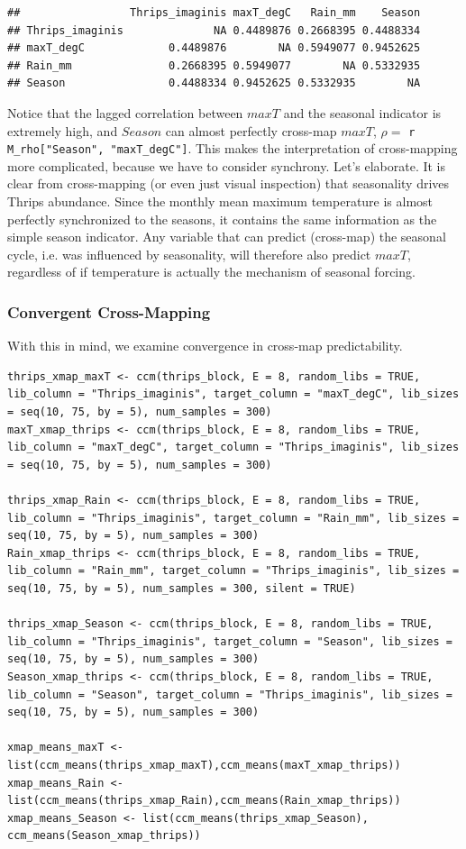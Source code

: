 \begin{lstlisting}[backgroundcolor = \color{white}, commentstyle = \ttfamily]
##                 Thrips_imaginis maxT_degC   Rain_mm    Season
## Thrips_imaginis              NA 0.4489876 0.2668395 0.4488334
## maxT_degC             0.4489876        NA 0.5949077 0.9452625
## Rain_mm               0.2668395 0.5949077        NA 0.5332935
## Season                0.4488334 0.9452625 0.5332935        NA
\end{lstlisting}

Notice that the lagged correlation between $maxT$ and the seasonal indicator is extremely high, and $Season$ can almost perfectly cross-map $maxT$, $\rho =$ \lstinline{r M_rho["Season", "maxT_degC"]}. This makes the interpretation of cross-mapping more complicated, because we have to consider synchrony. Let's elaborate. It is clear from cross-mapping (or even just visual inspection) that seasonality drives Thrips abundance. Since the monthly mean maximum temperature is almost perfectly synchronized to the seasons, it contains the same information as the simple season indicator. Any variable that can predict (cross-map) the seasonal cycle, i.e. was influenced by seasonality, will therefore also predict $maxT$, regardless of if temperature is actually the mechanism of seasonal forcing.

\subsubsection{Convergent Cross-Mapping}

With this in mind, we examine convergence in cross-map predictability.

\begin{lstlisting}
thrips_xmap_maxT <- ccm(thrips_block, E = 8, random_libs = TRUE, lib_column = "Thrips_imaginis", target_column = "maxT_degC", lib_sizes = seq(10, 75, by = 5), num_samples = 300)
maxT_xmap_thrips <- ccm(thrips_block, E = 8, random_libs = TRUE, lib_column = "maxT_degC", target_column = "Thrips_imaginis", lib_sizes = seq(10, 75, by = 5), num_samples = 300)

thrips_xmap_Rain <- ccm(thrips_block, E = 8, random_libs = TRUE, lib_column = "Thrips_imaginis", target_column = "Rain_mm", lib_sizes = seq(10, 75, by = 5), num_samples = 300)
Rain_xmap_thrips <- ccm(thrips_block, E = 8, random_libs = TRUE, lib_column = "Rain_mm", target_column = "Thrips_imaginis", lib_sizes = seq(10, 75, by = 5), num_samples = 300, silent = TRUE)

thrips_xmap_Season <- ccm(thrips_block, E = 8, random_libs = TRUE, lib_column = "Thrips_imaginis", target_column = "Season", lib_sizes = seq(10, 75, by = 5), num_samples = 300)
Season_xmap_thrips <- ccm(thrips_block, E = 8, random_libs = TRUE, lib_column = "Season", target_column = "Thrips_imaginis", lib_sizes = seq(10, 75, by = 5), num_samples = 300)

xmap_means_maxT <- list(ccm_means(thrips_xmap_maxT),ccm_means(maxT_xmap_thrips))
xmap_means_Rain <- list(ccm_means(thrips_xmap_Rain),ccm_means(Rain_xmap_thrips))
xmap_means_Season <- list(ccm_means(thrips_xmap_Season), ccm_means(Season_xmap_thrips))
\end{lstlisting}


